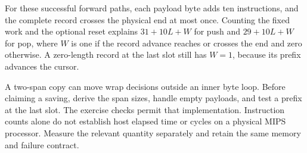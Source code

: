 For these successful forward paths, each payload byte adds ten instructions, and
the complete record crosses the physical end at most once. Counting the fixed work
and the optional reset explains \(31+10L+W\) for push and \(29+10L+W\) for pop,
where \(W\) is one if the record advance reaches or crosses the end and zero
otherwise. A zero-length record at the last slot still has \(W=1\), because its
prefix advances the cursor.

A two-span copy can move wrap decisions outside an inner byte loop. Before claiming
a saving, derive the span sizes, handle empty payloads, and test a prefix at the
last slot. The exercise checks permit that implementation. Instruction counts alone
do not establish host elapsed time or cycles on a physical MIPS processor. Measure
the relevant quantity separately and retain the same memory and failure contract.
